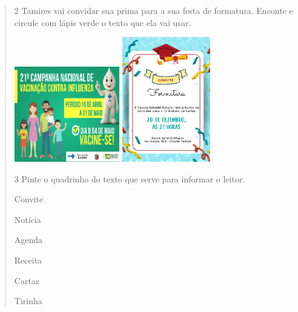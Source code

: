 \begin{verse}


\num{2} Tamires vai convidar sua prima para a sua festa de formatura. 
Enconte e circule com lápis verde o texto que ela vai usar. 


\includegraphics[width=1.80556in,height=1.63403in]{media/image100.png}
\includegraphics[width=1.51458in,height=2.14444in]{media/image103.png}


\num{3} Pinte o quadrinho do texto que serve para informar o leitor.


\begin{boxlist}
\boxitem[] Convite

\boxitem[] Notícia

\boxitem[] Agenda 

\boxitem[] Receita

\boxitem[] Cartaz 

\boxitem[] Tirinha
\end{boxlist}


\end{verse}
